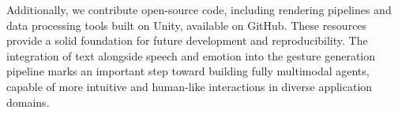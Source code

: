 Additionally, we contribute open-source code, including rendering pipelines and data processing tools built on Unity, available on GitHub. These resources provide a solid foundation for future development and reproducibility. The integration of text alongside speech and emotion into the gesture generation pipeline marks an important step toward building fully multimodal agents, capable of more intuitive and human-like interactions in diverse application domains.


%
%
%	
%	
%	
